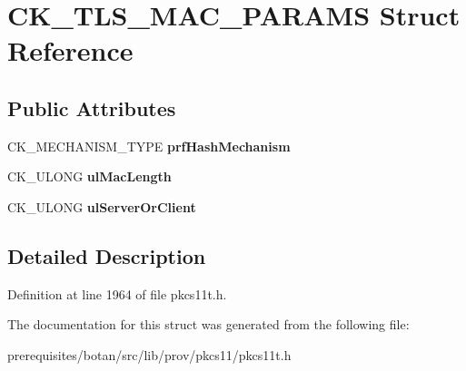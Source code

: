 \hypertarget{struct_c_k___t_l_s___m_a_c___p_a_r_a_m_s}{}\section{C\+K\+\_\+\+T\+L\+S\+\_\+\+M\+A\+C\+\_\+\+P\+A\+R\+A\+MS Struct Reference}
\label{struct_c_k___t_l_s___m_a_c___p_a_r_a_m_s}
\subsection*{Public Attributes}
\begin{DoxyCompactItemize}
\item 
\mbox{\label{struct_c_k___t_l_s___m_a_c___p_a_r_a_m_s_ab1f82ced652eac930c3d3c930a9825f2}} 
C\+K\+\_\+\+M\+E\+C\+H\+A\+N\+I\+S\+M\+\_\+\+T\+Y\+PE {\bfseries prf\+Hash\+Mechanism}
\item 
\mbox{\label{struct_c_k___t_l_s___m_a_c___p_a_r_a_m_s_ab81041349514911306fbed80af4b26fe}} 
C\+K\+\_\+\+U\+L\+O\+NG {\bfseries ul\+Mac\+Length}
\item 
\mbox{\label{struct_c_k___t_l_s___m_a_c___p_a_r_a_m_s_aab6e29179b6c8106b037587a26764edd}} 
C\+K\+\_\+\+U\+L\+O\+NG {\bfseries ul\+Server\+Or\+Client}
\end{DoxyCompactItemize}


\subsection{Detailed Description}


Definition at line 1964 of file pkcs11t.\+h.



The documentation for this struct was generated from the following file\+:\begin{DoxyCompactItemize}
\item 
prerequisites/botan/src/lib/prov/pkcs11/pkcs11t.\+h\end{DoxyCompactItemize}
